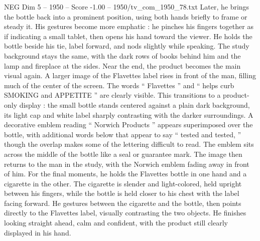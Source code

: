 \begin{textsample}{NEG Dim 5 – 1950 – Score -1.00 – 1950/tv\_com\_1950\_78.txt}
Later, he brings the bottle back into a prominent position, using both hands briefly to frame or steady it.
His gestures become more emphatic : he pinches his fingers together as if indicating a small tablet, then opens his hand toward the viewer.
He holds the bottle beside his tie, label forward, and nods slightly while speaking.
The study background stays the same, with the dark rows of books behind him and the lamp and fireplace at the sides.
Near the end, the product becomes the main visual again.
A larger image of the Flavettes label rises in front of the man, filling much of the center of the screen.
The words “ Flavettes ” and “ helps curb SMOKING and APPETITE ” are clearly visible.
This transitions to a product-only display : the small bottle stands centered against a plain dark background, its light cap and white label sharply contrasting with the darker surroundings.
A decorative emblem reading “ Norwich Products ” appears superimposed over the bottle, with additional words below that appear to say “ tested and tested, ” though the overlap makes some of the lettering difficult to read.
The emblem sits across the middle of the bottle like a seal or guarantee mark.
The image then returns to the man in the study, with the Norwich emblem fading away in front of him.
For the final moments, he holds the Flavettes bottle in one hand and a cigarette in the other.
The cigarette is slender and light-colored, held upright between his fingers, while the bottle is held closer to his chest with the label facing forward.
He gestures between the cigarette and the bottle, then points directly to the Flavettes label, visually contrasting the two objects.
He finishes looking straight ahead, calm and confident, with the product still clearly displayed in his hand.

\end{textsample}
